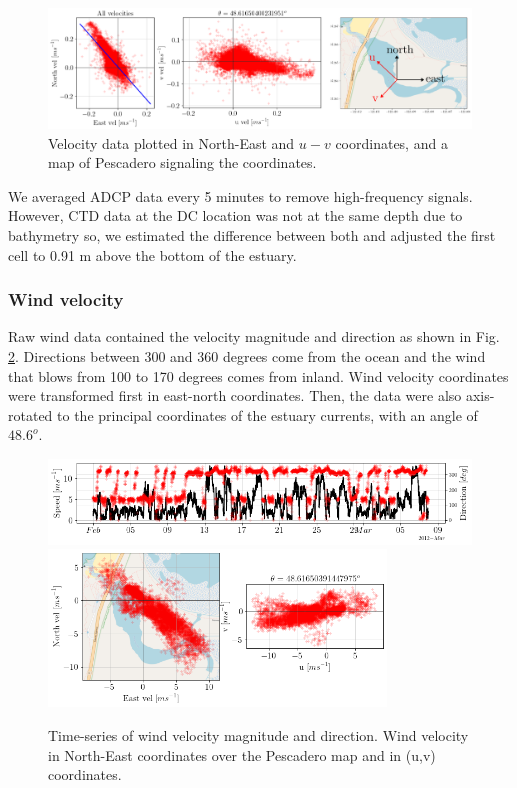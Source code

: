 \documentclass[tesis.tex]{subfiles}
\begin{document}
\begin{figure}[h!]
    \centering
    \includegraphics[width=\textwidth]{Imagenes/rotacion.png}
    \caption{Velocity data plotted in North-East and $u-v$ coordinates, and a map of Pescadero signaling the coordinates.}
    \label{fig:rotacion}
\end{figure}

We averaged ADCP data every 5 minutes to remove high-frequency signals. However, CTD data at the DC location was not at the same depth due to bathymetry so, we estimated the difference between both and adjusted the first cell to 0.91 m above the bottom of the estuary. 

\subsubsection{Wind velocity}

Raw wind data contained the velocity magnitude and direction as shown in Fig. \ref{fig:wind_raw}. Directions between 300 and 360 degrees come from the ocean and the wind that blows from 100 to 170 degrees comes from inland. Wind velocity coordinates were transformed first in east-north coordinates. Then, the data were also axis-rotated to the principal coordinates of the estuary currents, with an angle of $48.6^o$.

\begin{figure}[h!]
    \centering
    \includegraphics[width=\textwidth]{Imagenes/wind_raw.png}
    \includegraphics[width=0.8\textwidth]{Imagenes/wind_rotation.png}
    \caption{Time-series of wind velocity magnitude and direction. Wind velocity in North-East coordinates over the Pescadero map and in (u,v) coordinates.}
    \label{fig:wind_raw}
\end{figure}
\end{document}
